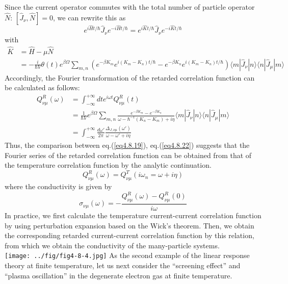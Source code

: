 Since the current operator commutes with the total number of particle operator $\hat N$: $[\hat J_\nu,\hat N]=0$, we can rewrite this as 
\[
e^{i\hat Ht/\hbar} \hat J_\nu e^{-i\hat Ht/\hbar} =e^{i\hat Kt/\hbar} \hat J_\nu e^{-i\hat Kt/\hbar} 
\]
with 
\[
\begin{aligned}
\hat K&=\hat H-\mu \hat N\\
&=-\frac{i}{\hbar V} \theta(t)e^{\beta\Omega} \sum_{m,n}\left( e^{-\beta K_m} e^{i(K_m-K_n)t/\hbar}-e^{-\beta K_n} e^{i(K_m-K_n)t/\hbar} \right)  \langle m|\hat J_\nu|n\rangle \langle n| \hat J_\mu|m\rangle
\end{aligned}
\]
Accordingly, the Fourier transformation of the retarded correlation function can be calculated as follows:
\begin{equation}\label{eq4.8.22}
\begin{aligned}
Q^R_{\nu\mu}(\omega)&=\int_{-\infty}^{+\infty} dte^{i\omega t} Q^R_{\nu\mu}(t)\\
&=\frac{1}{\hbar V}e^{\beta\Omega} \sum_{m,n} \frac{e^{-\beta K_m}-e^{-\beta K_n}}{\omega-\hbar^{-1}(K_n-K_m)+i\eta} \langle m|\hat J_\nu|n\rangle \langle n| \hat J_\mu|m\rangle\\
&=\int_{-\infty}^{+\infty} \frac{d\omega'}{2\pi} \frac{\Delta_{J,\nu\mu}(\omega')}{\omega-\omega'+i\eta}
\end{aligned}
\end{equation}
 Thus, the comparison between eq.(\ref{eq4.8.19}), eq.(\ref{eq4.8.22}) suggests that the Fourier series of the retarded correlation function can be obtained from that of the temperature correlation function by the analytic continuation.
\begin{equation}
Q^R_{\nu\mu} (\omega)=Q^T_{\nu\mu}(i\omega_n=\omega+i\eta)
\end{equation}
where the conductivity is given by
\begin{equation}
\sigma_{\nu\mu}(\omega)=-\frac{Q^R_{\nu\mu}(\omega)-Q^R_{\nu\mu}(0)}{i\omega}
\end{equation}
 In practice, we first calculate the temperature current-current correlation function by using perturbation expansion based on the Wick's theorem.
 Then, we obtain the corresponding retarded current-current correlation function by this relation, from which we obtain the conductivity of the many-particle systems.\\
\texttt{[image: ../fig/fig4-8-4.jpg]}
 As the second example of the linear response theory at finite temperature, let us next consider the ``screening effect'' and ``plasma oscillation'' in the degenerate electron gas at finite temperature.










